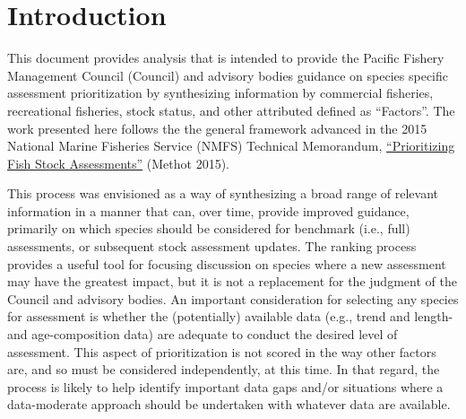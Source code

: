 \documentclass[11pt,
  english,
  a4paper,
]{article}
\begin{document}
\newcommand{\lt}{\ensuremath <}
\newcommand{\gt}{\ensuremath >}

\pagebreak
{}
\setcounter{page}{1}

\renewcommand{\thetable}{\roman{table}}
\renewcommand{\thefigure}{\roman{figure}}

\setlength\parskip{0.5em plus 0.1em minus 0.2em}

\pagebreak
\setlength{\parskip}{5mm plus1mm minus1mm}
\setcounter{page}{1}
\renewcommand{\thefigure}{\arabic{figure}}
\renewcommand{\thetable}{\arabic{table}}
\setcounter{table}{0}
\setcounter{figure}{0}

\setlength\parskip{0.5em plus 0.1em minus 0.2em}


\hypertarget{introduction}{%
\section{Introduction}\label{introduction}}

\leavevmode\tagmcend\tagstructend


This document provides analysis that is intended to provide the Pacific Fishery Management Council (Council) and advisory bodies guidance on species specific assessment prioritization by synthesizing information by commercial fisheries, recreational fisheries, stock status, and other attributed defined as ``Factors''. The work presented here follows the the general framework advanced in the 2015 National Marine Fisheries Service (NMFS) Technical Memorandum, {\href{https://www.st.nmfs.noaa.gov/Assets/stock/documents/PrioritizingFishStockAssessments_FinalWeb.pdf}{``Prioritizing Fish Stock Assessments''}\leavevmode\tagmcend\tagstructend} {(Methot 2015)\leavevmode\tagmcend\tagstructend}.

\leavevmode\tagmcend\tagstructend\par


This process was envisioned as a way of synthesizing a broad range of relevant information in a manner that can, over time, provide improved guidance, primarily on which species should be considered for benchmark (i.e., full) assessments, or subsequent stock assessment updates. The ranking process provides a useful tool for focusing discussion on species where a new assessment may have the greatest impact, but it is not a replacement for the judgment of the Council and advisory bodies. An important consideration for selecting any species for assessment is whether the (potentially) available data (e.g., trend and length- and age-composition data) are adequate to conduct the desired level of assessment. This aspect of prioritization is not scored in the way other factors are, and so must be considered independently, at this time. In that regard, the process is likely to help identify important data gaps and/or situations where a data-moderate approach should be undertaken with whatever data are available.
\end{document}
